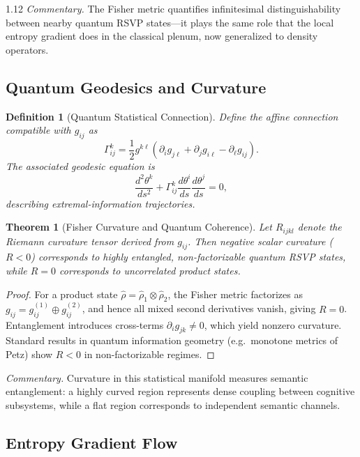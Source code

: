 \documentclass[12pt,a4paper]{article}
\numberwithin{equation}{section}
\newtheorem{definition}{Definition}[section]
\newtheorem{theorem}{Theorem}[section]
\theoremstyle{remark}
\theoremstyle{definition}
\begin{document}
\begin{spacing}{1.12}
\noindent\textit{Commentary.}
The Fisher metric quantifies infinitesimal distinguishability between nearby
quantum RSVP states---it plays the same role that the local entropy gradient
does in the classical plenum, now generalized to density operators.

\subsection{Quantum Geodesics and Curvature}

\begin{definition}[Quantum Statistical Connection]\label{def:connection}
Define the affine connection compatible with \(g_{ij}\) as
\[
\Gamma^k_{ij} =
\frac{1}{2} g^{k\ell}
(\partial_i g_{j\ell} + \partial_j g_{i\ell} - \partial_\ell g_{ij}).
\]
The associated geodesic equation is
\[
\frac{d^2 \theta^k}{ds^2} +
\Gamma^k_{ij} \frac{d\theta^i}{ds}\frac{d\theta^j}{ds} = 0,
\]
describing extremal-information trajectories.
\end{definition}

\begin{theorem}[Fisher Curvature and Quantum Coherence]\label{thm:curvature}
Let \(R_{ijkl}\) denote the Riemann curvature tensor derived from \(g_{ij}\).
Then negative scalar curvature (\(R < 0\)) corresponds to
highly entangled, non-factorizable quantum RSVP states,
while \(R = 0\) corresponds to uncorrelated product states.
\end{theorem}

\begin{proof}
For a product state \(\hat{\rho} = \hat{\rho}_1\otimes\hat{\rho}_2\),
the Fisher metric factorizes as \(g_{ij} = g^{(1)}_{ij}\oplus g^{(2)}_{ij}\),
and hence all mixed second derivatives vanish, giving \(R=0\).
Entanglement introduces cross-terms
\(\partial_i g_{jk}\neq0\),
which yield nonzero curvature.
Standard results in quantum information geometry
(e.g.\ monotone metrics of Petz)
show \(R<0\) in non-factorizable regimes.
\end{proof}

\noindent\textit{Commentary.}
Curvature in this statistical manifold measures semantic entanglement:
a highly curved region represents dense coupling between cognitive subsystems,
while a flat region corresponds to independent semantic channels.

\subsection{Entropy Gradient Flow}


\end{spacing}
\end{document}
